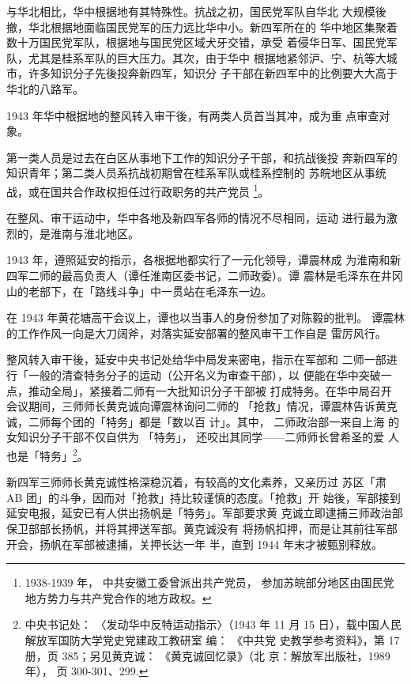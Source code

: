 与华北相比，华中根据地有其特殊性。抗战之初，国民党军队自华北
大规模後撤，华北根据地面临国民党军的压力远比华中小。新四军所在的
华中地区集聚着数十万国民党军队，根据地与国民党区域犬牙交错，承受
着侵华日军、国民党军队，尤其是桂系军队的巨大压力。其次，由于华中
根据地紧邻沪、宁、杭等大城市，许多知识分子先後投奔新四军，知识分
子干部在新四军中的比例要大大高于华北的八路军。

1943 年华中根据地的整风转入审干後，有两类人员首当其冲，成为重
点审查对象。

第一类人员是过去在白区从事地下工作的知识分子干部，和抗战後投
奔新四军的知识青年；第二类人员系抗战初期曾在桂系军队或桂系控制的
苏皖地区从事统战，或在国共合作政权担任过行政职务的共产党员
\footnote{ 1938-1939 年，
中共安徽工委曾派出共产党员，
参加苏皖部分地区由国民党地方势力与共产党合作的地方政权。}。

在整风、审干运动中，华中各地及新四军各师的情况不尽相同，运动
进行最为激烈的，是淮南与淮北地区。

1943 年，遵照延安的指示，各根据地都实行了一元化领导，谭震林成
为淮南和新四军二师的最高负责人（谭任淮南区委书记，二师政委）。谭
震林是毛泽东在井冈山的老部下，在「路线斗争」中一贯站在毛泽东一边。

在 1943 年黄花塘高干会议上，谭也以当事人的身份参加了对陈毅的批判。
谭震林的工作作风一向是大刀阔斧，对落实延安部署的整风审干工作自是
雷厉风行。

整风转入审干後，延安中央书记处给华中局发来密电，指示在军部和 二师一部进
行「一般的清查特务分子的运动（公开名义为审查干部），以 便能在华中突破一
点，推动全局」，紧接着二师有一大批知识分子干部被 打成特务。在华中局召开
会议期间，三师师长黄克诚向谭震林询问二师的 「抢救」情况，谭震林告诉黄克
诚，二师每个团的「特务」都是「数以百 计」。其中， 二师政治部一来自上海
的女知识分子干部不仅自供为 「特务」， 还咬出其同学——二师师长曾希圣的爱
人也是「特务」\footnote{中央书记处： 〈发动华中反特运动指示〉（1943 年
11 月 15 日），载中国人民解放军国防大学党史党建政工教研室 编： 《中共党
史教学参考资料》，第 17 册，页 385；另见黄克诚： 《黄克诚回忆录》（北
京：解放军出版社，1989 年）， 页 300-301、299.}。

新四军三师师长黄克诚性格深稳沉着，有较高的文化素养，又亲历过
苏区「肃 AB 团」的斗争，因而对「抢救」持比较谨慎的态度。「抢救」开
始後，军部接到延安电报，延安已有人供出扬帆是「特务」。军部要求黄
克诚立即逮捕三师政治部保卫部部长扬帆，并将其押送军部。黄克诚没有
将扬帆扣押，而是让其前往军部开会，扬帆在军部被逮捕，关押长达一年
半，直到 1944 年末才被甄别释放。

